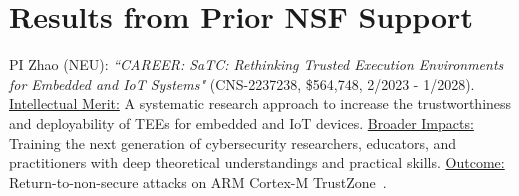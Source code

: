 \documentclass[11pt,oneside,onecolumn,letterpaper]{article}
\begin{document}
\section{Results from Prior NSF Support}

PI Zhao (NEU): \emph{``CAREER: SaTC: Rethinking Trusted Execution Environments for Embedded and IoT Systems"} (CNS-2237238, \$564,748, 2/2023 - 1/2028).
\ul{Intellectual Merit:} A systematic research approach to increase the trustworthiness and deployability of TEEs for embedded and IoT devices.
\ul{Broader Impacts:} Training the next generation of cybersecurity researchers, educators, and practitioners with deep theoretical understandings and practical skills.
\ul{Outcome:} Return-to-non-secure attacks on ARM Cortex-M TrustZone~\cite{ma2023dac}.

\newpage


\end{document}
